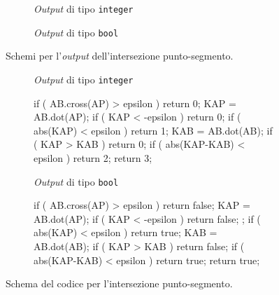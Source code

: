 \begin{figure}[h!]
	\hfill
	\begin{subfigure}{.45\textwidth}
		\centering
		\caption{\textit{Output} di tipo \texttt{integer}}
	\end{subfigure}
	\hfill
	\begin{subfigure}{.45\textwidth}
		\centering
		\caption{\textit{Output} di tipo \texttt{bool}}
	\end{subfigure}
	\hfill
	\caption{Schemi per l'\textit{output} dell'intersezione punto-segmento.}
\end{figure}
\begin{figure}[h!]
	\hfill
	\begin{subfigure}[t]{.45\linewidth}
	\raggedright
	\textit{Output} di tipo \texttt{integer}\\
	\vspace{.5em}
	\begin{pseudoc}
	if ( AB.cross(AP) > epsilon )
		{ return 0; }
	KAP = AB.dot(AP);
	if ( KAP < -epsilon )
		{ return 0; }
	if ( abs(KAP) < epsilon  )
		{ return 1; }
	KAB = AB.dot(AB);
	if ( KAP > KAB )
		{ return 0; }
	if ( abs(KAP-KAB) < epsilon )
		{ return 2; }
	return 3;
	\end{pseudoc}
	\end{subfigure}
	\hfill
	\begin{subfigure}[t]{.45\textwidth}
	\raggedright
	\textit{Output} di tipo \texttt{bool}\\
	\vspace{.5em}
	\begin{pseudoc}
	if ( AB.cross(AP) > epsilon )
		{ return false; }
	KAP = AB.dot(AP);
	if ( KAP < -epsilon )
		{ return false; };
	if ( abs(KAP) < epsilon )
		{ return true; }
	KAB = AB.dot(AB);
	if ( KAP > KAB ) 
		{ return false; }
	if ( abs(KAP-KAB) < epsilon )
		{ return true; }
	return true;
	\end{pseudoc}
	\end{subfigure}
	\hfill
	\caption{Schema del codice per l'intersezione punto-segmento.}
	\label{pointsegment}
\end{figure}
%
